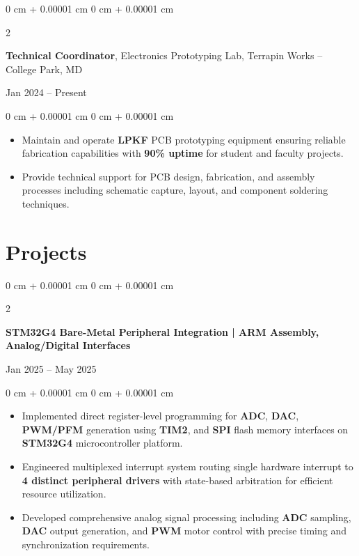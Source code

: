 \documentclass[10pt, letterpaper]{article}
\newenvironment{highlights}{
    \begin{itemize}[
        topsep=0.05 cm,
        parsep=0.05 cm,
        partopsep=0pt,
        itemsep=0pt,
        leftmargin=0 cm + 10pt
    ]
}{
    \end{itemize}
}
\newenvironment{onecolentry}{
    \begin{adjustwidth}{
        0 cm + 0.00001 cm
    }{
        0 cm + 0.00001 cm
    }
}{
    \end{adjustwidth}
}
\newenvironment{twocolentry}[2][]{
    \onecolentry
    \def\secondColumn{#2}
    \setcolumnwidth{\fill, 4.5 cm}
    \begin{paracol}{2}
}{
    \switchcolumn \raggedleft \secondColumn
    \end{paracol}
    \endonecolentry
}
\begin{document}
        \vspace{0.10 cm}

        \begin{twocolentry}{
            Jan 2024 – Present
        }
            \textbf{Technical Coordinator}, Electronics Prototyping Lab, Terrapin Works -- College Park, MD
        \end{twocolentry}
        \vspace{0.05 cm}
        \begin{onecolentry}
            \begin{highlights}
                \item Maintain and operate \textbf{LPKF} PCB prototyping equipment ensuring reliable fabrication capabilities with \textbf{90\% uptime} for student and faculty projects.
                \item Provide technical support for PCB design, fabrication, and assembly processes including schematic capture, layout, and component soldering techniques.
            \end{highlights}
        \end{onecolentry}

    \section{Projects}

        \begin{twocolentry}{
            Jan 2025 – May 2025
        }
            \textbf{STM32G4 Bare-Metal Peripheral Integration | ARM Assembly, Analog/Digital Interfaces}
        \end{twocolentry}
        \vspace{0.05 cm}
        \begin{onecolentry}
            \begin{highlights}
                \item Implemented direct register-level programming for \textbf{ADC}, \textbf{DAC}, \textbf{PWM/PFM} generation using \textbf{TIM2}, and \textbf{SPI} flash memory interfaces on \textbf{STM32G4} microcontroller platform.
                \item Engineered multiplexed interrupt system routing single hardware interrupt to \textbf{4 distinct peripheral drivers} with state-based arbitration for efficient resource utilization.
                \item Developed comprehensive analog signal processing including \textbf{ADC} sampling, \textbf{DAC} output generation, and \textbf{PWM} motor control with precise timing and synchronization requirements.
            \end{highlights}
        \end{onecolentry}
\end{document}
